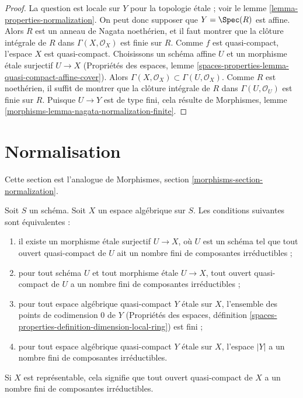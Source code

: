 \begin{proof}
La question est locale sur $Y$ pour la topologie étale ; voir
le lemme \ref{lemma-properties-normalization}.
On peut donc supposer que $Y = \Spec(R)$ est affine.
Alors $R$ est un anneau de Nagata noethérien,
et il faut montrer que la clôture intégrale de
$R$ dans $\Gamma(X, \mathcal{O}_X)$ est finie sur $R$.
Comme $f$ est quasi-compact, l'espace $X$ est quasi-compact.
Choisissons un schéma affine $U$ et un morphisme étale surjectif
$U \to X$ (Propriétés des espaces, lemme
\ref{spaces-properties-lemma-quasi-compact-affine-cover}).
Alors $\Gamma(X, \mathcal{O}_X) \subset \Gamma(U, \mathcal{O}_X)$.
Comme $R$ est noethérien, il suffit de montrer que
la clôture intégrale de $R$ dans $\Gamma(U, \mathcal{O}_U)$
est finie sur $R$. Puisque $U \to Y$ est de type fini,
cela résulte de
Morphismes, lemme \ref{morphisms-lemma-nagata-normalization-finite}.
\end{proof}







\section{Normalisation}
\label{section-normalization}

\noindent
Cette section est l'analogue de
Morphismes, section \ref{morphisms-section-normalization}.

\begin{lemma}
\label{lemma-prepare-normalization}
Soit $S$ un schéma. Soit $X$ un espace algébrique sur $S$.
Les conditions suivantes sont équivalentes :
\begin{enumerate}
\item il existe un morphisme étale surjectif $U \to X$, où $U$
est un schéma tel que tout ouvert quasi-compact de $U$ ait
un nombre fini de composantes irréductibles ;
\item pour tout schéma $U$ et tout morphisme étale
$U \to X$, tout ouvert quasi-compact de $U$ a un nombre fini de
composantes irréductibles ;
\item pour tout espace algébrique quasi-compact $Y$ étale sur $X$,
l'ensemble des points de codimension $0$ de $Y$ (Propriétés des espaces,
définition \ref{spaces-properties-definition-dimension-local-ring})
est fini ;
\item pour tout espace algébrique quasi-compact $Y$ étale sur $X$,
l'espace $|Y|$ a un nombre fini de composantes irréductibles.
\end{enumerate}
Si $X$ est représentable, cela signifie que tout ouvert quasi-compact de $X$
a un nombre fini de composantes irréductibles.
\end{lemma}

